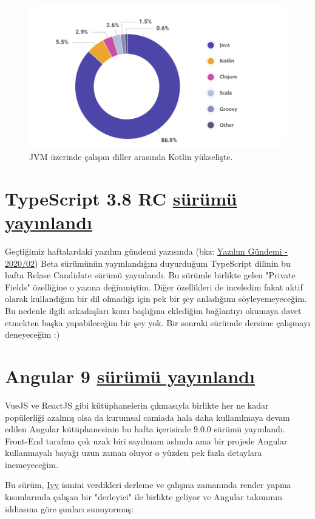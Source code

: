 \documentclass[11pt]{article}
\begin{document}
\begin{figure}[htbp]
\centering
\includegraphics[width=.9\linewidth]{gorseller/jvm-ekosistem-2020-diller.png}
\caption{JVM üzerinde çalışan diller arasında Kotlin yükselişte.}
\end{figure}
\newpage
\section{TypeScript 3.8 RC \href{https://devblogs.microsoft.com/typescript/announcing-typescript-3-8-rc/}{sürümü yayınlandı}}
\label{sec:orgda5b38d}
Geçtiğimiz haftalardaki yazılım gündemi yazısında (bkz: \href{../02/yazilim-gundemi-2020.02.pdf}{Yazılım Gündemi -
2020/02}) Beta sürümünün yayınlandığını duyurduğum TypeScript dilinin bu hafta
Relase Candidate sürümü yayınlandı. Bu sürümle birlikte gelen "Private Fields"
özelliğine o yazına değinmiştim. Diğer özellikleri de inceledim fakat aktif
olarak kullandığım bir dil olmadığı için pek bir şey anladığımı
söyleyemeyeceğim. Bu nedenle ilgili arkadaşları konu başlığına eklediğim
bağlantıyı okumaya davet etmekten başka yapabileceğim bir şey yok. Bir sonraki
sürümde dersime çalışmayı deneyeceğim :)
\section{Angular 9 \href{https://blog.angular.io/version-9-of-angular-now-available-project-ivy-has-arrived-23c97b63cfa3}{sürümü yayınlandı}}
\label{sec:org8482ff0}
VueJS ve ReactJS gibi kütüphanelerin çıkmasıyla birlikte her ne kadar
popülerliği azalmış olsa da kurumsal camiada hala daha kullanılmaya devam
edilen Angular kütüphanesinin bu hafta içerisinde 9.0.0 sürümü yayınlandı.
Front-End tarafına çok uzak biri sayılmam aslında ama bir projede Angular
kullanmayalı bayağı uzun zaman oluyor o yüzden pek fazla detaylara
inemeyeceğim.

Bu sürüm, \href{https://angular.io/guide/ivy}{Ivy} ismini verdikleri derleme ve çalışma zamanında render yapma
kısımlarında çalışan bir "derleyici" ile birlikte geliyor ve Angular takımının
iddiasına göre şunları sunuyormuş:
\end{document}
